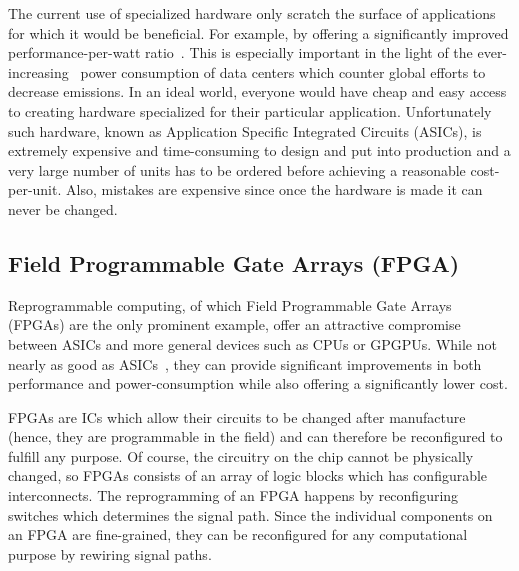 The current use of specialized hardware only scratch the surface of applications
for which it would be beneficial. For example, by offering a significantly
improved performance-per-watt ratio~\cite{fowers2012performance}. This is
especially important in the light of the
ever-increasing~\cite{avgerinou2017trends} power consumption of data centers
which counter global efforts to decrease emissions. In an ideal world, everyone
would have cheap and easy access to creating hardware specialized for their
particular application. Unfortunately such hardware, known as Application
Specific Integrated Circuits (ASICs), is extremely expensive and time-consuming
to design and put into production and a very large number of units has to be
ordered before achieving a reasonable cost-per-unit. Also, mistakes are
expensive since once the hardware is made it can never be changed.




\subsection{Field Programmable Gate Arrays (FPGA)}
Reprogrammable computing, of which Field Programmable Gate Arrays (FPGAs) are
the only prominent example, offer an attractive compromise between ASICs and
more general devices such as CPUs or GPGPUs. While not nearly as good as
ASICs~\cite{kuon2007measuring}, they can provide significant improvements in
both performance and power-consumption while also offering a significantly lower
cost.

FPGAs are ICs which allow their circuits to be changed after manufacture (hence,
they are programmable in the field) and can therefore be reconfigured to fulfill
any purpose. Of course, the circuitry on the chip cannot be physically changed,
so FPGAs consists of an array of logic blocks which has configurable
interconnects. The reprogramming of an FPGA happens by reconfiguring switches
which determines the signal path. Since the individual components on an FPGA are
fine-grained, they can be reconfigured for any computational purpose by rewiring
signal paths.

